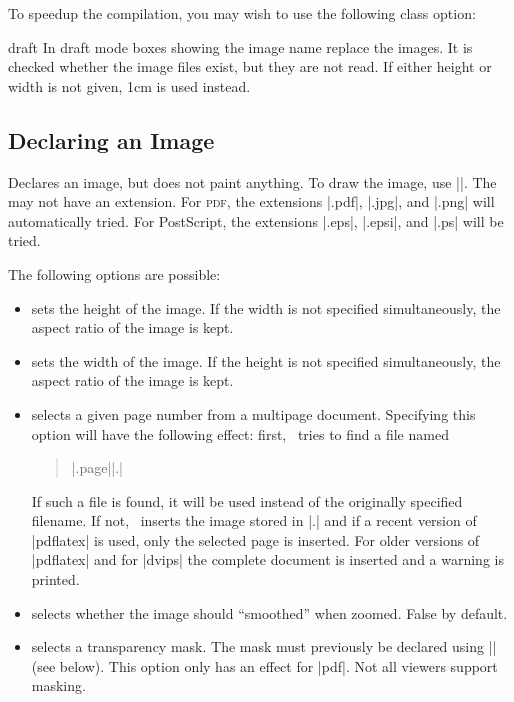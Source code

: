 To speedup the compilation, you may wish to use the following class
option:
\begin{packageoption}{draft}
  In draft mode boxes showing the image name replace the
  images. It is checked whether the image files exist, but they are
  not read. If either height or width is not given, 1cm is used
  instead.
\end{packageoption}

\subsection{Declaring an Image}

\begin{command}{\pgfdeclareimage{}}
  Declares an image, but does not paint anything. To draw the image,
  use ||. The  may not
  have an extension.  For \textsc{pdf}, the extensions |.pdf|, |.jpg|,
  and |.png| will automatically tried. For PostScript, the extensions
  |.eps|, |.epsi|, and |.ps| will be tried.

  The following options are possible:
  \begin{itemize}
  \item
     sets the height of the
    image. If the width is not specified simultaneously, the aspect
    ratio of the image is kept.
  \item
     sets the width of the
    image. If the height is not specified simultaneously, the aspect
    ratio of the image is kept.
  \item
     selects a given page number
    from a multipage document. Specifying this option will have the
    following effect: first, \pgfname\ tries to find a file named
    \begin{quote}
      |.page||.|
    \end{quote}
    If such a file is found, it will be used instead of the originally
    specified filename. If not, \pgfname\ inserts the image stored in
    |.| and if a recent version of
    |pdflatex| is used, only the selected page is inserted. For older
    versions of |pdflatex| and for |dvips| the complete document is
    inserted and a warning is printed.
  \item
     selects whether the
    image should ``smoothed'' when zoomed. False by default.
  \item
     selects a transparency mask. The
    mask must previously be declared using |\pgfdeclaremask| (see
    below). This option only has an effect for |pdf|. Not all viewers
    support masking.
  \end{itemize}


\end{command}
